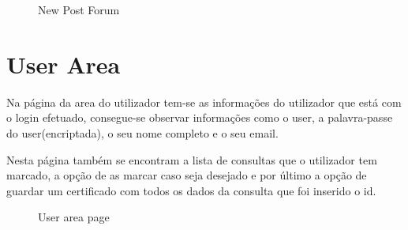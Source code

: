 \documentclass[12pt]{report}
\begin{document}
\begin{figure}[H]{
{
\caption{New Post Forum}
}
}\end{figure}

\newpage
\section{User Area}
\quad Na página da area do utilizador tem-se as informações do utilizador que está com o login efetuado, consegue-se observar informações como o user, a palavra-passe do user(encriptada), o seu nome completo e o seu email.\par
Nesta página também se encontram a lista de consultas que o utilizador tem marcado, a opção de as marcar caso seja desejado e por último a opção de guardar um certificado com todos os dados da consulta que foi inserido o id.
\newline
\begin{figure}[H]{
{
\caption{User area page}
}
}\end{figure}

\newpage
\end{document}
